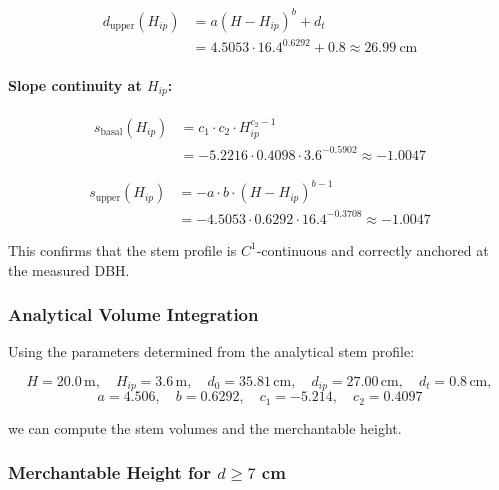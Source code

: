 \documentclass[twocolumn, bibliography=totoc]{scrartcl}
\begin{document}
\begin{equation}
\begin{aligned}
d_{\text{upper}}(H_{ip})
&= a (H - H_{ip})^b + d_t \\
&= 4.5053 \cdot 16.4^{0.6292} + 0.8 
\approx 26.99\ \text{cm}
\end{aligned}
\end{equation}

\paragraph{Slope continuity at $H_{ip}$:}

\begin{equation}
\begin{aligned}
s_{\text{basal}}(H_{ip})
&= c_1 \cdot c_2 \cdot H_{ip}^{c_2 - 1} \\
&= -5.2216 \cdot 0.4098 \cdot 3.6^{-0.5902} 
\approx -1.0047
\end{aligned}
\end{equation}

\begin{equation}
\begin{aligned}
s_{\text{upper}}(H_{ip})
&= -a \cdot b \cdot (H - H_{ip})^{b-1} \\
&= -4.5053 \cdot 0.6292 \cdot 16.4^{-0.3708} 
\approx -1.0047
\end{aligned}
\end{equation}

This confirms that the stem profile is $C^1$-continuous and correctly anchored at the measured DBH.


\subsubsection{Analytical Volume Integration}

Using the parameters determined from the analytical stem profile:

\[
H = 20.0\,\text{m}, \quad 
H_{ip} = 3.6\,\text{m}, \quad
d_0 = 35.81\,\text{cm}, \quad
d_{ip} = 27.00\,\text{cm}, \quad
d_t = 0.8\,\text{cm},
\]
\[
a = 4.506, \quad
b = 0.6292, \quad
c_1 = -5.214, \quad
c_2 = 0.4097
\]

we can compute the stem volumes and the merchantable height.

\subsubsection*{Merchantable Height for $d \ge 7$ cm}
\end{document}
